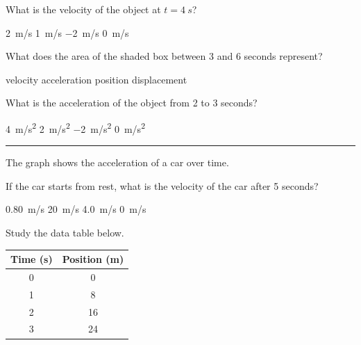 \documentclass[answers]{exam}
\begin{document}
\begin{questions}
\question \label{rruYR}
What is the velocity of the object at $t = \SI{4}{s}$?

\begin{randomizechoices}
    \correctchoice \SI{2}{m/s}
    \choice \SI{1}{m/s}
    \choice \SI{-2}{m/s}
    \choice \SI{0}{m/s}
\end{randomizechoices}

\question
What does the area of the shaded box between 3 and 6 seconds represent?

\begin{randomizechoices}
    \choice velocity
    \choice acceleration
    \choice position
    \correctchoice displacement
\end{randomizechoices}

\question \label{ynGeg}
What is the acceleration of the object from 2 to 3 seconds?

\begin{randomizechoices}
    \correctchoice \SI{4}{m/s^2}
    \choice \SI{2}{m/s^2}
    \choice \SI{-2}{m/s^2}
    \choice \SI{0}{m/s^2}
\end{randomizechoices}

\bigskip
\hrule

\question
The graph shows the acceleration of a car over time. 

\begin{center}
\end{center}

If the car starts from rest, what is the velocity of the car after 5
seconds?

\begin{randomizechoices}
    \choice \SI{0.80}{m/s}
    \correctchoice \SI{20}{m/s}
    \choice \SI{4.0}{m/s}
    \choice \SI{0}{m/s}
\end{randomizechoices}

\question
Study the data table below.

\begin{center}
    \begin{tabular}{c|c}
        \textbf{Time} (s) & \textbf{Position} (m) \\ \hline
         0 & 0 \\
         1 & 8 \\
         2 & 16 \\
         3 & 24 \\
    \end{tabular}
\end{center}


\end{questions}
\end{document}

